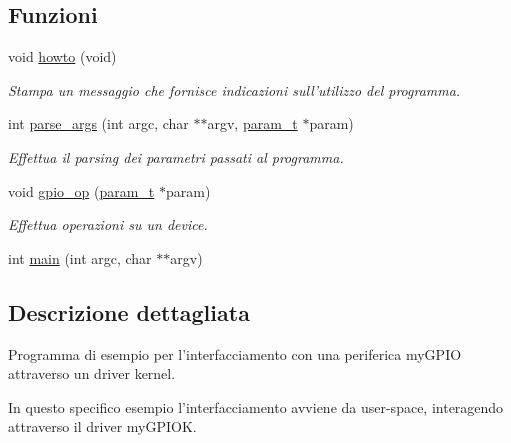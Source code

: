 \subsection*{Funzioni}
\begin{DoxyCompactItemize}
\item 
void \hyperlink{group___userspace-program_ga05909651fa170a63e98e3f8e13451b7b}{howto} (void)
\begin{DoxyCompactList}\small\item\em Stampa un messaggio che fornisce indicazioni sull'utilizzo del programma. \end{DoxyCompactList}\item 
int \hyperlink{group___userspace-program_ga65d977fb03a14dedd76e1515d6d24ff4}{parse\+\_\+args} (int argc, char $\ast$$\ast$argv, \hyperlink{structparam__t}{param\+\_\+t} $\ast$param)
\begin{DoxyCompactList}\small\item\em Effettua il parsing dei parametri passati al programma. \end{DoxyCompactList}\item 
void \hyperlink{group___userspace-program_ga63fab82d87963c07f9557a5f5d5d3e86}{gpio\+\_\+op} (\hyperlink{structparam__t}{param\+\_\+t} $\ast$param)
\begin{DoxyCompactList}\small\item\em Effettua operazioni su un device. \end{DoxyCompactList}\item 
int \hyperlink{group___userspace-program_ga3c04138a5bfe5d72780bb7e82a18e627}{main} (int argc, char $\ast$$\ast$argv)
\end{DoxyCompactItemize}


\subsection{Descrizione dettagliata}
Programma di esempio per l'interfacciamento con una periferica my\+G\+P\+I\+O attraverso un driver kernel. 

In questo specifico esempio l'interfacciamento avviene da user-\/space, interagendo attraverso il driver my\+G\+P\+I\+O\+K. 

